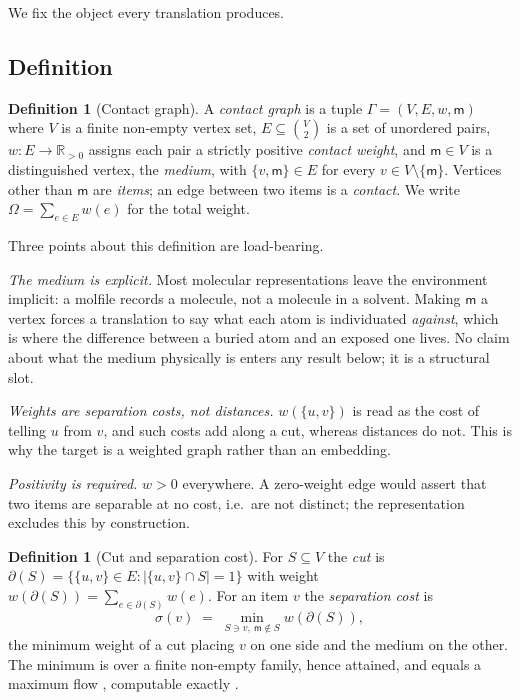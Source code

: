 \documentclass[11pt,twocolumn,a4paper]{article}
\theoremstyle{msthm}
\theoremstyle{definition}
\newtheorem{definition}[theorem]{Definition}
\theoremstyle{remark}
\newcommand{\R}{\mathbb{R}}
\newcommand{\Gph}{\Gamma}
\newcommand{\V}{V}
\newcommand{\E}{E}
\newcommand{\wt}{w}
\newcommand{\med}{\mathsf{m}}
\newcommand{\abs}[1]{\lvert#1\rvert}
\begin{document}
We fix the object every translation produces.

\subsection{Definition}

\begin{definition}[Contact graph]
\label{def:contact}
A \emph{contact graph} is a tuple $\Gph=(\V,\E,\wt,\med)$ where $\V$ is
a finite non-empty vertex set, $\E\subseteq\binom{\V}{2}$ is a set of
unordered pairs, $\wt\colon\E\to\R_{>0}$ assigns each pair a strictly
positive \emph{contact weight}, and $\med\in\V$ is a distinguished
vertex, the \emph{medium}, with $\{v,\med\}\in\E$ for every
$v\in\V\setminus\{\med\}$. Vertices other than $\med$ are \emph{items};
an edge between two items is a \emph{contact}. We write
$\Omega=\sum_{e\in\E}\wt(e)$ for the total weight.
\end{definition}

Three points about this definition are load-bearing.

\emph{The medium is explicit.} Most molecular representations leave the
environment implicit: a molfile records a molecule, not a molecule in a
solvent. Making $\med$ a vertex forces a translation to say what each
atom is individuated \emph{against}, which is where the difference
between a buried atom and an exposed one lives. No claim about what the
medium physically is enters any result below; it is a structural slot.

\emph{Weights are separation costs, not distances.} $\wt(\{u,v\})$ is
read as the cost of telling $u$ from $v$, and such costs add along a
cut, whereas distances do not. This is why the target is a weighted
graph rather than an embedding.

\emph{Positivity is required.} $\wt>0$ everywhere. A zero-weight edge
would assert that two items are separable at no cost, i.e.\ are not
distinct; the representation excludes this by construction.

\begin{definition}[Cut and separation cost]
\label{def:cut}
For $S\subseteq\V$ the \emph{cut} is
$\partial(S)=\{\{u,v\}\in\E: \abs{\{u,v\}\cap S}=1\}$ with weight
$\wt(\partial(S))=\sum_{e\in\partial(S)}\wt(e)$. For an item $v$ the
\emph{separation cost} is
\begin{equation}
\sigma(v)\;=\;\min_{S\ni v,\ \med\notin S}\wt(\partial(S)),
\label{eq:sepcost}
\end{equation}
the minimum weight of a cut placing $v$ on one side and the medium on
the other. The minimum is over a finite non-empty family, hence attained,
and equals a maximum flow \citep{fordfulkerson1956}, computable exactly
\citep{stoer1997simple,gomory1961multi}.
\end{definition}
\end{document}
